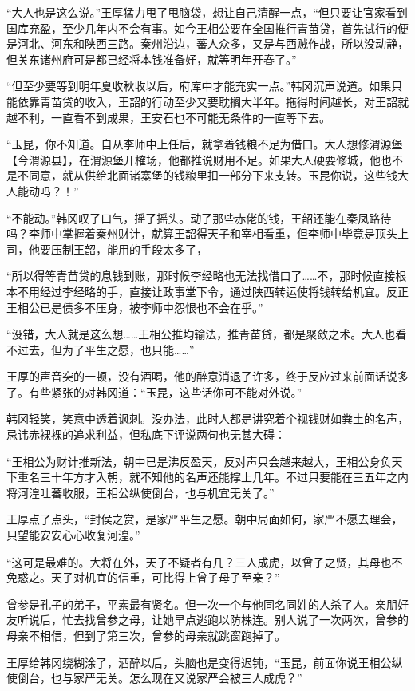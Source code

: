 “大人也是这么说。”王厚猛力甩了甩脑袋，想让自己清醒一点，“但只要让官家看到国库充盈，至少几年内不会有事。如今王相公要在全国推行青苗贷，首先试行的便是河北、河东和陕西三路。秦州沿边，蕃人众多，又是与西贼作战，所以没动静，但关东诸州府可是都已经将本钱准备好，就等明年开春了。”

“但至少要等到明年夏收秋收以后，府库中才能充实一点。”韩冈沉声说道。如果只能依靠青苗贷的收入，王韶的行动至少又要耽搁大半年。拖得时间越长，对王韶就越不利，一直看不到成果，王安石也不可能无条件的一直等下去。

“玉昆，你不知道。自从李师中上任后，就拿着钱粮不足为借口。大人想修渭源堡【今渭源县】，在渭源堡开榷场，他都推说财用不足。如果大人硬要修城，他也不是不同意，就从供给北面诸寨堡的钱粮里扣一部分下来支转。玉昆你说，这些钱大人能动吗？！”

“不能动。”韩冈叹了口气，摇了摇头。动了那些赤佬的钱，王韶还能在秦凤路待吗？李师中掌握着秦州财计，就算王韶得天子和宰相看重，但李师中毕竟是顶头上司，他要压制王韶，能用的手段太多了，

“所以得等青苗贷的息钱到账，那时候李经略也无法找借口了……不，那时候直接根本不用经过李经略的手，直接让政事堂下令，通过陕西转运使将钱转给机宜。反正王相公已是债多不压身，被李师中怨恨也不会在乎。”

“没错，大人就是这么想……王相公推均输法，推青苗贷，都是聚敛之术。大人也看不过去，但为了平生之愿，也只能……”

王厚的声音突的一顿，没有酒喝，他的醉意消退了许多，终于反应过来前面话说多了。有些紧张的对韩冈道：“玉昆，这些话你可不能对外说。”

韩冈轻笑，笑意中透着讽刺。没办法，此时人都是讲究着个视钱财如粪土的名声，忌讳赤裸裸的追求利益，但私底下评说两句也无甚大碍：

“王相公为财计推新法，朝中已是沸反盈天，反对声只会越来越大，王相公身负天下重名三十年方才入朝，就不知他的名声还能撑上几年。不过只要能在三五年之内将河湟吐蕃收服，王相公纵使倒台，也与机宜无关了。”

王厚点了点头，“封侯之赏，是家严平生之愿。朝中局面如何，家严不愿去理会，只望能安安心心收复河湟。”

“这可是最难的。大将在外，天子不疑者有几？三人成虎，以曾子之贤，其母也不免惑之。天子对机宜的信重，可比得上曾子母子至亲？”

曾参是孔子的弟子，平素最有贤名。但一次一个与他同名同姓的人杀了人。亲朋好友听说后，忙去找曾参之母，让她早点逃跑以防株连。别人说了一次两次，曾参的母亲不相信，但到了第三次，曾参的母亲就跳窗跑掉了。

王厚给韩冈绕糊涂了，酒醉以后，头脑也是变得迟钝，“玉昆，前面你说王相公纵使倒台，也与家严无关。怎么现在又说家严会被三人成虎？”


